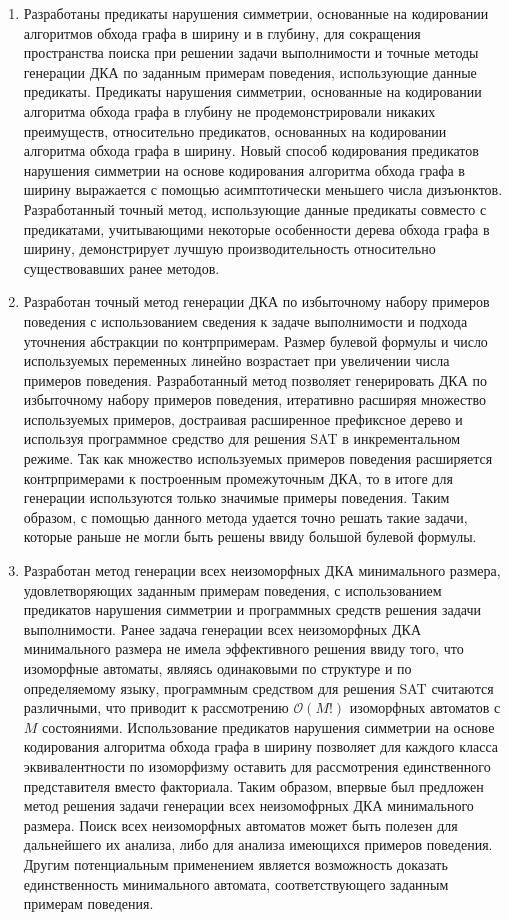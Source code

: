 \begin{enumerate}
  \item Разработаны предикаты нарушения симметрии, основанные на кодировании алгоритмов обхода графа в ширину и в глубину, для сокращения пространства поиска при решении задачи выполнимости и точные методы генерации ДКА по заданным примерам поведения, использующие данные предикаты. 
  Предикаты нарушения симметрии, основанные на кодировании алгоритма обхода графа в глубину не продемонстрировали никаких преимуществ, относительно предикатов, основанных на кодировании алгоритма обхода графа в ширину.
  Новый способ кодирования предикатов нарушения симметрии на основе кодирования алгоритма обхода графа в ширину выражается с помощью асимптотически меньшего числа дизъюнктов.
  Разработанный точный метод, использующие данные предикаты совместо с предикатами, учитывающими некоторые особенности дерева обхода графа в ширину, демонстрирует лучшую производительность относительно существовавших ранее методов.

  \item Разработан точный метод генерации ДКА по избыточному набору примеров поведения с использованием сведения к задаче выполнимости и подхода уточнения абстракции по контрпримерам.
  Размер булевой формулы и число используемых переменных линейно возрастает при увеличении числа примеров поведения.
  Разработанный метод позволяет генерировать ДКА по избыточному набору примеров поведения, итеративно расширяя множество используемых примеров, достраивая расширенное префиксное дерево и используя программное средство для решения SAT в инкрементальном режиме.
  Так как множество используемых примеров поведения расширяется контрпримерами к построенным промежуточным ДКА, то в итоге для генерации используются только значимые примеры поведения.
  Таким образом, с помощью данного метода удается точно решать такие задачи, которые раньше не могли быть решены ввиду большой булевой формулы.

  \item Разработан метод генерации всех неизоморфных ДКА минимального размера, удовлетворяющих заданным примерам поведения, с использованием предикатов нарушения симметрии и программных средств решения задачи выполнимости.
  Ранее задача генерации всех неизоморфных ДКА минимального размера не имела эффективного решения ввиду того, что изоморфные автоматы, являясь одинаковыми по структуре и по определяемому языку, программным средством для решения SAT считаются различными, что приводит к рассмотрению $\mathcal{O}\left(M!\right)$ изоморфных автоматов с $M$ состояниями.
  Использование предикатов нарушения симметрии на основе кодирования алгоритма обхода графа в ширину позволяет для каждого класса эквивалентности по изоморфизму оставить для рассмотрения единственного представителя вместо факториала. 
  Таким образом, впервые был предложен метод решения задачи генерации всех неизомофрных ДКА минимального размера.
  Поиск всех неизоморфных автоматов может быть полезен для дальнейшего их анализа, либо для анализа имеющихся примеров поведения.
  Другим потенциальным применением является возможность доказать единственность минимального автомата, соответствующего заданным примерам поведения.

 \end{enumerate}

